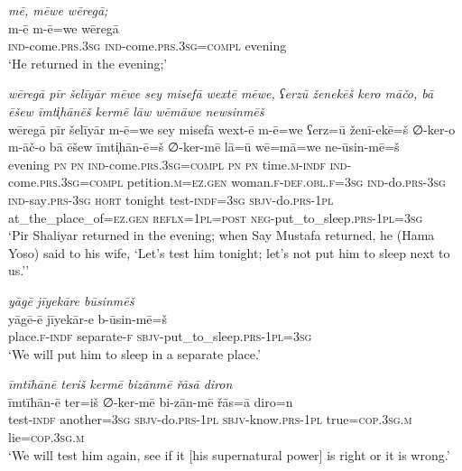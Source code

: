 \ea \label{ŽP.61}
\textit{mē, mēwe wēregā;} \\ 
\gll m-ē m-ē=we wēregā \\ 
 \textsc{ind-}come\textsc{.prs}\textsc{.3sg} \textsc{ind-}come\textsc{.prs}\textsc{.3sg}\textsc{=compl} evening \\ 
\glt `He returned in the evening;'
\z 
 
\ea \label{ŽP.62}
\textit{wēregā pīr šelīyār mēwe sey misefā wextē mēwe, ʕerzū ženekēš kero māčo, bā ēšew īmti̩hānēš kermē lāw wēmāwe newsinmēš} \\ 
\gll wēregā pīr šelīyār m-ē=we sey misefā wext-ē m-ē=we ʕerz=ū ženī-ekē=š ∅-ker-o m-āč-o bā ēšew īmti̩hān-ē=š ∅-ker-mē lā=ū wē=mā=we ne-ūsin-mē=š \\ 
 evening \textsc{pn} \textsc{pn} \textsc{ind-}come\textsc{.prs}\textsc{.3sg}\textsc{=compl} \textsc{pn} \textsc{pn} time\textsc{.m}\textsc{-indf} \textsc{ind-}come\textsc{.prs}\textsc{.3sg}\textsc{=compl} petition\textsc{.m}\textsc{\textsc{=ez.gen}} woman\textsc{.f}\textsc{-def}\textsc{.obl}\textsc{.f}\textsc{=3sg} \textsc{ind-}do\textsc{.prs}\textsc{-3sg} \textsc{ind-}say\textsc{.prs}\textsc{-3sg} \textsc{hort} tonight test\textsc{-indf}\textsc{=3sg} \textsc{sbjv-}do\textsc{.prs}\textsc{-1pl} at\_the\_place\_of\textsc{\textsc{=ez.gen}} \textsc{reflx}\textsc{=1pl}\textsc{=\textsc{post}} \textsc{neg-}put\_to\_sleep\textsc{.prs}\textsc{-1pl}\textsc{=3sg} \\ 
\glt `Pir Shaliyar returned in the evening; when Say Mustafa returned, he (Hama Yoso) said to his wife, ‘Let’s test him tonight; let’s not put him to sleep next to us.’'
\z 
 
\ea \label{ŽP.63}
\textit{yāgē jīyekāre būsinmēš} \\ 
\gll yāgē-ē jīyekār-e b-ūsin-mē=š \\ 
 place\textsc{.f}\textsc{-indf} separate\textsc{-f} \textsc{sbjv-}put\_to\_sleep\textsc{.prs}\textsc{-1pl}\textsc{=3sg} \\ 
\glt `We will put him to sleep in a separate place.'
\z 
 
\ea \label{ŽP.64}
\textit{īmtīhānē teriš kermē bizānmē řāsā diron} \\ 
\gll īmtīhān-ē ter=iš ∅-ker-mē bi-zān-mē řās=ā diro=n \\ 
 test\textsc{-indf} another\textsc{=3sg} \textsc{sbjv-}do\textsc{.prs}\textsc{-1pl} \textsc{sbjv-}know\textsc{.prs}\textsc{-1pl} true\textsc{=cop}\textsc{.3sg}\textsc{.m} lie\textsc{=cop}\textsc{.3sg}\textsc{.m} \\ 
\glt `We will test him again, see if it [his supernatural power] is right or it is wrong.'
\z 
 
